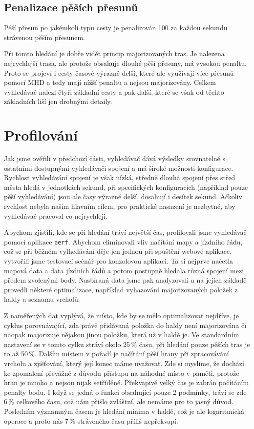 \subsection{Penalizace pěších přesunů}
Pěší přesun po jakémkoli typu cesty je penalizován 100 za každou sekundu
strávenou pěším přesunem.

Při tomto hledání je dobře vidět princip majorizovaných tras. Je nalezena
nejrychlejší trasa, ale protože obsahuje dlouhé pěší přesuny, má vysokou
penaltu. Proto se projeví i cesty časově výrazně delší, které ale využívají více
přesunů pomocí MHD a tedy mají nížší penaltu a nejsou majorizovány. Celkem
vyhledávač nalezl čtyři základní cesty a pak další, které se však od těchto
základních liší jen drobnými detaily.
\section{Profilování}
Jak jsme ověřili v předchozí části, vyhledávač dává výsledky srovnatelné s
ostatními dostupnými vyhledávači spojení a má široké možnosti konfigurace.
Rychlost vyhledávání spojení je však nízká, středně dlouhá spojení přes střed
města hledá v jednotkách sekund, při specifických konfiguracích (například pouze
pěší vyhledávání) jsou ale časy výrazně delší, dosahují i desítek sekund.
Ačkoliv rychlost nebyla našim hlavním cílem, pro praktické nasazení je nezbytné,
aby vyhledávač pracoval co nejrychleji. 

Abychom zjistili, kde se při hledání tráví největší čas, profilovali jsme
vyhledávač pomocí aplikace {\tt perf}. Abychom eliminovali vliv načítání mapy a
jízdního řádu, což se při běžném vylhedávání děje jen jednou při spuštění webové
aplikace, vytvořili jsme testovací scénář pro konzolovou aplikaci. Ta si nejprve
načetla mapová data a data jízdních řádů a potom postupně hledala různá spojení
mezi předem zvolenými body. Nasbíraná data jsme pak analyzovali a na jejich
základě provedli některé optimalizace, například vyhazování majorizovaných
položek z haldy a seznamu vrcholů.

Z naměřených dat vyplývá, že místo, kde by se mělo optimalizovat nejdříve, je
cyklus porovnávající, zda právě přidávaná položka do haldy není majorizována či
naopak majorizuje nějakou jinou položku, která už v haldě je. Ve standardním
nastavení se v tomto cylku stráví okolo 25\,\% času, při hledání pouze pěších
tras je to až 50\,\%. Dalším místem v pořadí je načítání pěší hrany při
zpracovávání vrcholu a zjišťování, který její konec máme uvažovat. Zde si
myslíme, že dochází ke zpomalení převážně z důvodu přístupu na náhodné místo v
paměti, protože hran je mnoho a nejsou nijak setříděné. Překvapivě velký čas je
zabrán počítáním penalty bodu. I když se jedná o funkci obsahující pouze 2
podmínky, tráví se zde 6\,\% celkového času, což nám přišlo zvláštní, ale nemáme
pro to jasný důvod. Posledním významným časem je hledání minima v haldě, což je
ale logaritmická operace a proto nás 7\,\% stráveného času příliš nepřekvapí.


